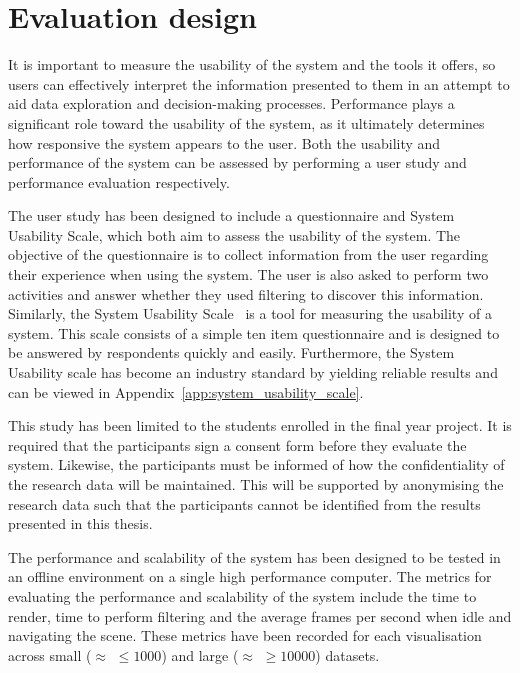 \section{Evaluation design} {
\label{sec:evaluation_design}

	It is important to measure the usability of the system and the tools it offers, so users can effectively interpret the information presented to them in an attempt to aid data exploration and decision-making processes. Performance plays a significant role toward the usability of the system, as it ultimately determines how responsive the system appears to the user. Both the usability and performance of the system can be assessed by performing a user study and performance evaluation respectively.

	The user study has been designed to include a questionnaire and System Usability Scale, which both aim to assess the usability of the system. The objective of the questionnaire is to collect information from the user regarding their experience when using the system. The user is also asked to perform two activities and answer whether they used filtering to discover this information. Similarly, the System Usability Scale~\parencite{brooke1996sus} is a tool for measuring the usability of a system. This scale consists of a simple ten item questionnaire and is designed to be answered by respondents quickly and easily. Furthermore, the System Usability scale has become an industry standard by yielding reliable results and can be viewed in Appendix~\ref{app:system_usability_scale}.

	This study has been limited to the students enrolled in the final year project. It is required that the participants sign a consent form before they evaluate the system. Likewise, the participants must be informed of how the confidentiality of the research data will be maintained. This will be supported by anonymising the research data such that the participants cannot be identified from the results presented in this thesis.

	The performance and scalability of the system has been designed to be tested in an offline environment on a single high performance computer. The metrics for evaluating the performance and scalability of the system include the time to render, time to perform filtering and the average frames per second when idle and navigating the scene. These metrics have been recorded for each visualisation across small ($\approx$ $\le1000$) and large ($\approx$ $\ge10000$) datasets.

}
